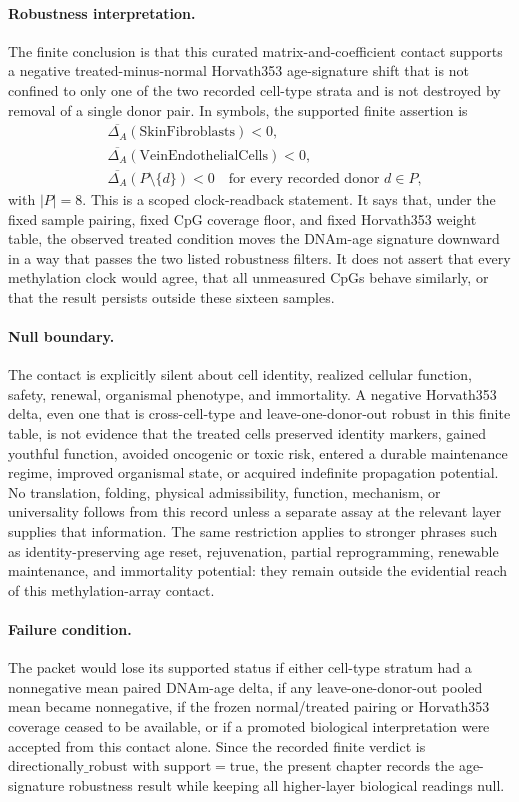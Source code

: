 \paragraph{Robustness interpretation.}
The finite conclusion is that this curated matrix-and-coefficient contact supports a negative treated-minus-normal Horvath353 age-signature shift that is not confined to only one of the two recorded cell-type strata and is not destroyed by removal of a single donor pair. In symbols, the supported finite assertion is
$$
\begin{aligned}
&\overline{\Delta_A}(\mathrm{SkinFibroblasts})<0,\\
&\overline{\Delta_A}(\mathrm{VeinEndothelialCells})<0,\\
&\overline{\Delta_A}(P\setminus\{d\})<0\quad\text{for every recorded donor }d\in P,
\end{aligned}
$$
with $|P|=8$. This is a scoped clock-readback statement. It says that, under the fixed sample pairing, fixed CpG coverage floor, and fixed Horvath353 weight table, the observed treated condition moves the DNAm-age signature downward in a way that passes the two listed robustness filters. It does not assert that every methylation clock would agree, that all unmeasured CpGs behave similarly, or that the result persists outside these sixteen samples.

\paragraph{Null boundary.}
The contact is explicitly silent about cell identity, realized cellular function, safety, renewal, organismal phenotype, and immortality. A negative Horvath353 delta, even one that is cross-cell-type and leave-one-donor-out robust in this finite table, is not evidence that the treated cells preserved identity markers, gained youthful function, avoided oncogenic or toxic risk, entered a durable maintenance regime, improved organismal state, or acquired indefinite propagation potential. No translation, folding, physical admissibility, function, mechanism, or universality follows from this record unless a separate assay at the relevant layer supplies that information. The same restriction applies to stronger phrases such as identity-preserving age reset, rejuvenation, partial reprogramming, renewable maintenance, and immortality potential: they remain outside the evidential reach of this methylation-array contact.

\paragraph{Failure condition.}
The packet would lose its supported status if either cell-type stratum had a nonnegative mean paired DNAm-age delta, if any leave-one-donor-out pooled mean became nonnegative, if the frozen normal/treated pairing or Horvath353 coverage ceased to be available, or if a promoted biological interpretation were accepted from this contact alone. Since the recorded finite verdict is $\mathrm{directionally\_robust}$ with $\mathrm{support}=\mathrm{true}$, the present chapter records the age-signature robustness result while keeping all higher-layer biological readings null.
